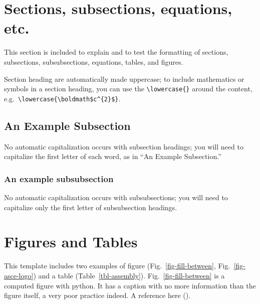 \documentclass[NewProceedings, InsideFigs,LineNumbers]{asce-quarto}
\begin{document}
\section{Sections, subsections, equations,
etc.}\label{sections-subsections-equations-etc.}

This section is included to explain and to test the formatting of
sections, subsections, subsubsections, equations, tables, and figures.

Section heading are automatically made uppercase; to include mathematics
or symbols in a section heading, you can use the
\texttt{\textbackslash{}lowercase\{\}} around the content,
e.g.~\texttt{\textbackslash{}lowercase\{\textbackslash{}boldmath\$c\^{}\{2\}\$\}}.

\subsection{An Example Subsection}\label{an-example-subsection}

No automatic capitalization occurs with subsection headings; you will
need to capitalize the first letter of each word, as in ``An Example
Subsection.''

\subsubsection{An example subsubsection}\label{an-example-subsubsection}

No automatic capitalization occurs with subsubsections; you will need to
capitalize only the first letter of subsubsection headings.

\section{Figures and Tables}\label{figures-and-tables}

This template includes two examples of figure
(Fig.~\ref{fig-fill-between}, Fig.~\ref{fig-asce-logo}) and a table
(Table~\ref{tbl-assembly}). Fig.~\ref{fig-fill-between} is a computed
figure with python. It has a caption with no more information than the
figure itself, a very poor practice indeed. A reference here
().
\end{document}
